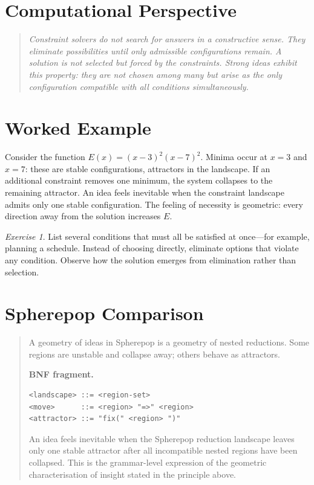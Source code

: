 \documentclass[11pt]{book}
\theoremstyle{plain}
\theoremstyle{definition}
\theoremstyle{remark}
\newtheorem{exercise}[theorem]{Exercise}
\newenvironment{computationalaside}
  {\begin{quote}\small\itshape}
  {\end{quote}}
\newenvironment{spherepopcomparison}
  {\begin{quote}\small}
  {\end{quote}}
\begin{document}
\section*{Computational Perspective}
\begin{computationalaside}
Constraint solvers do not search for answers in a constructive sense.
They eliminate possibilities until only admissible configurations remain.
A solution is not selected but forced by the constraints. Strong ideas
exhibit this property: they are not chosen among many but arise as the
only configuration compatible with all conditions simultaneously.
\end{computationalaside}

\section*{Worked Example}
Consider the function $E(x) = (x-3)^2(x-7)^2$. Minima occur at $x = 3$
and $x = 7$: these are stable configurations, attractors in the
landscape. If an additional constraint removes one minimum, the system
collapses to the remaining attractor. An idea feels inevitable when the
constraint landscape admits only one stable configuration. The feeling
of necessity is geometric: every direction away from the solution
increases $E$.

\begin{exercise}
List several conditions that must all be satisfied at once---for
example, planning a schedule. Instead of choosing directly, eliminate
options that violate any condition. Observe how the solution emerges
from elimination rather than selection.
\end{exercise}

\section*{Spherepop Comparison}
\begin{spherepopcomparison}
A geometry of ideas in Spherepop is a geometry of nested reductions.
Some regions are unstable and collapse away; others behave as attractors.

\textbf{BNF fragment.}
\begin{verbatim}
<landscape> ::= <region-set>
<move>      ::= <region> "=>" <region>
<attractor> ::= "fix(" <region> ")"
\end{verbatim}

An idea feels inevitable when the Spherepop reduction landscape leaves
only one stable attractor after all incompatible nested regions have
been collapsed. This is the grammar-level expression of the geometric
characterisation of insight stated in the principle above.
\end{spherepopcomparison}
\end{document}
